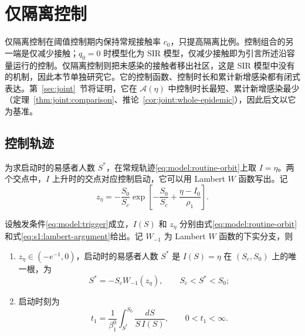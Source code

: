 \section{仅隔离控制}
\label{sec:s1}
仅隔离控制在阈值控制期内保持常规接触率 $c_0$，只提高隔离比例。控制组合的另一端是仅减少接触；$q_0=0$ 时模型化为 SIR 模型，仅减少接触即为引言所述沿容量运行的控制。仅隔离控制则把未感染的接触者移出社区，这是 SIR 模型中没有的机制，因此本节单独研究它。它的控制函数、控制时长和累计新增感染都有闭式表达。第~\ref{sec:joint}~节将证明，它在 $\mathcal A(\eta)$ 中控制时长最短、累计新增感染最少（定理~\ref{thm:joint:comparison}、推论~\ref{cor:joint:whole-epidemic}），因此后文以它为基准。

\subsection{控制轨迹}
为求启动时的易感者人数 $S^*$，在常规轨迹\eqref{eq:model:routine-orbit}上取 $I=\eta$。两个交点中，$I$ 上升时的交点对应控制启动，它可以用 Lambert $W$ 函数写出。记
\begin{equation}
z_\eta=-\frac{S_0}{S_c}\exp\!\left[-\frac{S_0}{S_c}+\frac{\eta-I_0}{\rho_1}\right].
\label{eq:s1:lambert-argument}
\end{equation}
\begin{theorem}
\label{thm:s1:start}\label{thm:s1:trigger}
设触发条件\eqref{eq:model:trigger}成立，$I(S)$ 和 $z_\eta$ 分别由式\eqref{eq:model:routine-orbit}和式\eqref{eq:s1:lambert-argument}给出。记 $W_{-1}$ 为 Lambert $W$ 函数的下实分支，则
\begin{enumerate}
\renewcommand{\labelenumi}{(\roman{enumi})}
\item $z_\eta\in(-e^{-1},0)$，启动时的易感者人数 $S^*$ 是 $I(S)=\eta$ 在 $(S_c,S_0)$ 上的唯一根，为
\begin{equation}
S^*=-S_cW_{-1}(z_\eta),\qquad S_c<S^*<S_0;
\label{eq:s1:Sstar-lambert}
\end{equation}
\item 启动时刻为
\begin{equation}
t_1=\frac{1}{\beta_1^0}\int_{S^*}^{S_0}\frac{dS}{S\,I(S)},\qquad 0<t_1<\infty.
\label{eq:s1:t1}
\end{equation}
\end{enumerate}
\end{theorem}
